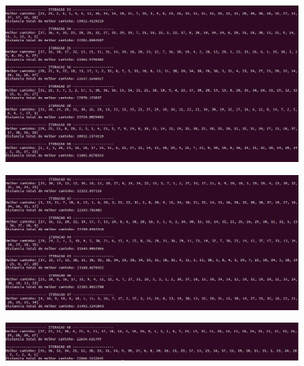 \documentclass[hidelinks,12pt]{article}
\begin{document}
		\newpage

		\begin{figure}[!h]
			\centering
			\includegraphics[scale=0.3]{Figures/m38-2-5.png}
		\end{figure}

		\newpage

		\begin{figure}[!h]
			\centering
			\includegraphics[scale=0.3]{Figures/m38-2-6.png}
		\end{figure}

		\newpage

		\begin{figure}[!h]
			\centering
			\includegraphics[scale=0.3]{Figures/m38-2-7.png}
		\end{figure}
\end{document}
